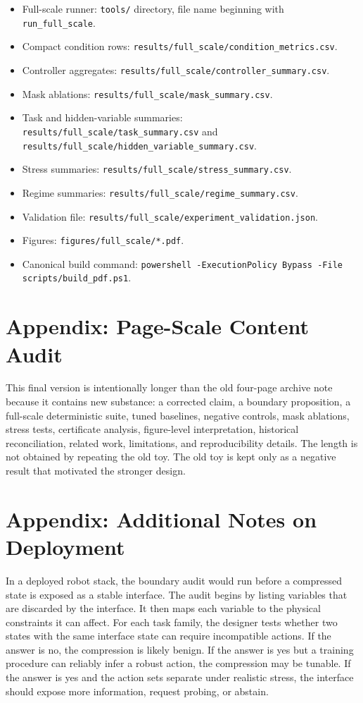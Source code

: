 \documentclass{article}
\begin{document}
\begin{itemize}
    \item Full-scale runner: \texttt{tools/} directory, file name beginning with \texttt{run\_full\_scale}.
    \item Compact condition rows: \texttt{results/full\_scale/condition\_metrics.csv}.
    \item Controller aggregates: \texttt{results/full\_scale/controller\_summary.csv}.
    \item Mask ablations: \texttt{results/full\_scale/mask\_summary.csv}.
    \item Task and hidden-variable summaries: \texttt{results/full\_scale/task\_summary.csv} and \texttt{results/full\_scale/hidden\_variable\_summary.csv}.
    \item Stress summaries: \texttt{results/full\_scale/stress\_summary.csv}.
    \item Regime summaries: \texttt{results/full\_scale/regime\_summary.csv}.
    \item Validation file: \texttt{results/full\_scale/experiment\_validation.json}.
    \item Figures: \texttt{figures/full\_scale/*.pdf}.
    \item Canonical build command: \texttt{powershell -ExecutionPolicy Bypass -File scripts/build\_pdf.ps1}.
\end{itemize}

\section{Appendix: Page-Scale Content Audit}

This final version is intentionally longer than the old four-page archive note
because it contains new substance: a corrected claim, a boundary proposition, a
full-scale deterministic suite, tuned baselines, negative controls, mask
ablations, stress tests, certificate analysis, figure-level interpretation,
historical reconciliation, related work, limitations, and reproducibility
details. The length is not obtained by repeating the old toy. The old toy is kept
only as a negative result that motivated the stronger design.

\section{Appendix: Additional Notes on Deployment}

In a deployed robot stack, the boundary audit would run before a compressed state
is exposed as a stable interface. The audit begins by listing variables that are
discarded by the interface. It then maps each variable to the physical
constraints it can affect. For each task family, the designer tests whether two
states with the same interface state can require incompatible actions. If the
answer is no, the compression is likely benign. If the answer is yes but a
training procedure can reliably infer a robust action, the compression may be
tunable. If the answer is yes and the action sets separate under realistic
stress, the interface should expose more information, request probing, or
abstain.
\end{document}

